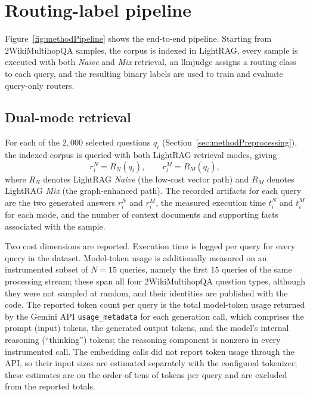 \documentclass[english, bibtex]{kththesis}               %
\numberwithin{listing}{chapter}
\begin{document}
\section{Routing-label pipeline}
\label{sec:methodPipeline}

Figure~\ref{fig:methodPipeline} shows the end-to-end pipeline. Starting from 2WikiMultihopQA samples, the corpus is indexed in LightRAG, every sample is executed with both \emph{Naive} and \emph{Mix} retrieval, an \gls{llmjudge} assigns a routing class to each query, and the resulting binary labels are used to train and evaluate query-only routers.

\subsection{Dual-mode retrieval}
\label{sec:methodDualMode}

For each of the $2{,}000$ selected questions \(q_i\) (Section~\ref{sec:methodPreprocessing}), the indexed corpus is queried with both LightRAG retrieval modes, giving
\begin{equation}
\label{eq:dualModeOutputs}
r_i^{N} = R_N(q_i),
\qquad
r_i^{M} = R_M(q_i),
\end{equation}
where \(R_N\) denotes LightRAG \emph{Naive} (the low-cost vector path) and \(R_M\) denotes LightRAG \emph{Mix} (the graph-enhanced path). The recorded artifacts for each query are the two generated answers \(r_i^N\) and \(r_i^M\), the measured execution time \(t_i^N\) and \(t_i^M\) for each mode, and the number of context documents and supporting facts associated with the sample.

Two cost dimensions are reported. Execution time is logged per query for every query in the dataset. Model-token usage is additionally measured on an instrumented subset of \(N = 15\) queries, namely the first $15$ queries of the same processing stream; these span all four 2WikiMultihopQA question types, although they were not sampled at random, and their identities are published with the code. The reported token count per query is the total model-token usage returned by the Gemini \gls{API} \texttt{usage\_metadata} for each generation call, which comprises the prompt (input) tokens, the generated output tokens, and the model's internal reasoning (``thinking'') tokens; the reasoning component is nonzero in every instrumented call. The embedding calls did not report token usage through the API, so their input sizes are estimated separately with the configured tokenizer; these estimates are on the order of tens of tokens per query and are excluded from the reported totals.
\end{document}
